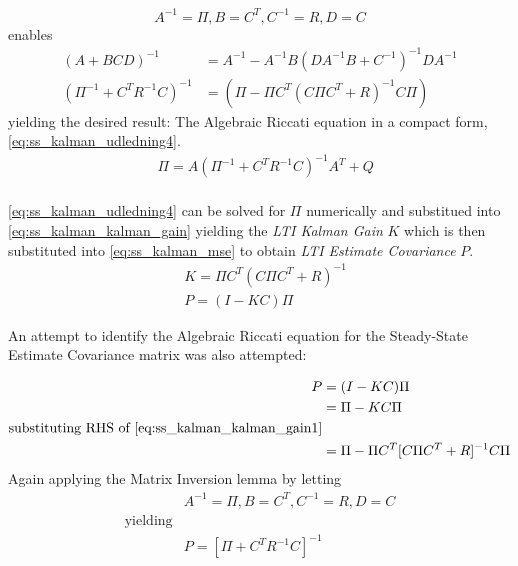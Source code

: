 \begin{equation}
		{A}^{-1} = \Pi, {B} = {C}^T, {C}^{-1} = {R}, {D} = {C} \label{eq:ss_kalman_udledning3}
\end{equation}
enables 
\begin{align}
		({A}+{BCD})^{-1} &= {A}^{-1} - {A}^{-1}{B} ({D}{A}^{-1}{B}+{C}^{-1})^{-1}{D}{A}^{-1} \\ \label{eq:ss_kalman_MatrixInversionLemma}
		(\Pi^{-1} + {C}^T {R}^{-1} {C})^{-1} &= (\Pi - \Pi {C}^T ({C} \Pi {C}^T + {R})^{-1} {C} \Pi)
\end{align}
yielding the desired result: The Algebraic Riccati equation in a compact form, \cref{eq:ss_kalman_udledning4}.
\begin{equation}
	\begin{split}\label{eq:ss_kalman_udledning4}
		&\Pi = {A} (\Pi^{-1} + {C}^T {R}^{-1} {C})^{-1} {A}^T + {Q}\\
	\end{split}
\end{equation}

\cref{eq:ss_kalman_udledning4} can be solved for $\Pi$ numerically and substitued into \cref{eq:ss_kalman_kalman_gain} yielding the \textit{LTI Kalman Gain} $ K $ which is then substituted into \cref{eq:ss_kalman_mse} to obtain \textit{LTI Estimate Covariance} $ P $.
\begin{align}
	& K = \Pi {C}^T ({C} \Pi {C}^T + {R})^{-1} \label{eq:ss_kalman_kalman_gain1} \\
	& P = ({I} - K {C}) \Pi \label{eq:ss_kalman_mse1} 
\end{align}

An attempt to identify the Algebraic Riccati equation for the Steady-State Estimate Covariance matrix was also attempted:


\begin{equation}
	\begin{split}\label{eq:ss_kalman_udledning5}
	 	P 	& = ({I} - K {C}) \Pi \\ %
		& = \Pi - K {C}\Pi \\
		\text{substituting RHS of \cref{eq:ss_kalman_kalman_gain1}} \\
		& = \Pi - \Pi {C}^T [{C} \Pi {C}^T + {R}]^{-1}{C}\Pi \\
	\end{split}
\end{equation}
Again applying the Matrix Inversion lemma by letting
\begin{equation}
	\begin{split}\label{eq:ss_kalman_udledning5}
		&{A}^{-1} = \Pi, {B} = {C}^T, {C}^{-1} = {R}, {D} = {C} \\
		\text{yielding} \\
		&P = [\Pi + {C}^T{R}^{-1}{C}]^{-1} \\ 
	\end{split}
\end{equation}     


